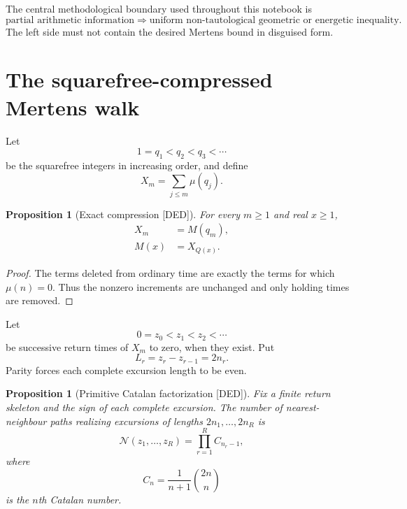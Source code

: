 \documentclass[11pt]{amsart}
\numberwithin{equation}{section}
\theoremstyle{plain}
\newtheorem{proposition}[theorem]{Proposition}
\theoremstyle{definition}
\theoremstyle{remark}
\newcommand{\Mert}{M}
\newcommand{\Mob}{\mu}
\newcommand{\Sq}{Q}
\newcommand{\DED}{\textup{[DED]}}
\begin{document}
The central methodological boundary used throughout this notebook is
\begin{equation}
\boxed{
\text{partial arithmetic information}
\Longrightarrow
\text{uniform non-tautological geometric or energetic inequality}.}
\label{eq:boundary-principle}
\end{equation}
The left side must not contain the desired Mertens bound in disguised form.

\section{The squarefree-compressed Mertens walk}
\label{sec:compressed-walk}

Let
\begin{equation}
1=q_1<q_2<q_3<\cdots
\label{eq:squarefree-order}
\end{equation}
be the squarefree integers in increasing order, and define
\begin{equation}
X_m=\sum_{j\le m}\Mob(q_j).
\label{eq:compressed-walk}
\end{equation}

\begin{proposition}[Exact compression \DED]
\label{prop:compression}
For every $m\ge1$ and real $x\ge1$,
\begin{align}
X_m&=\Mert(q_m),
\label{eq:compression-at-squarefree}\\
\Mert(x)&=X_{\Sq(x)}.
\label{eq:decompression}
\end{align}
\end{proposition}

\begin{proof}
The terms deleted from ordinary time are exactly the terms for which $\Mob(n)=0$.
Thus the nonzero increments are unchanged and only holding times are removed.
\end{proof}

Let
\begin{equation}
0=z_0<z_1<z_2<\cdots
\label{eq:return-times}
\end{equation}
be successive return times of $X_m$ to zero, when they exist.  Put
\begin{equation}
L_r=z_r-z_{r-1}=2n_r.
\label{eq:excursion-length}
\end{equation}
Parity forces each complete excursion length to be even.

\begin{proposition}[Primitive Catalan factorization \DED]
\label{prop:catalan-factorization}
Fix a finite return skeleton and the sign of each complete excursion.  The number of
nearest-neighbour paths realizing excursions of lengths $2n_1,\ldots,2n_R$ is
\begin{equation}
\mathcal N(z_1,\ldots,z_R)=\prod_{r=1}^{R}C_{n_r-1},
\label{eq:catalan-product}
\end{equation}
where
\begin{equation}
C_n=\frac{1}{n+1}\binom{2n}{n}
\label{eq:catalan-number}
\end{equation}
is the $n$th Catalan number.
\end{proposition}
\end{document}
